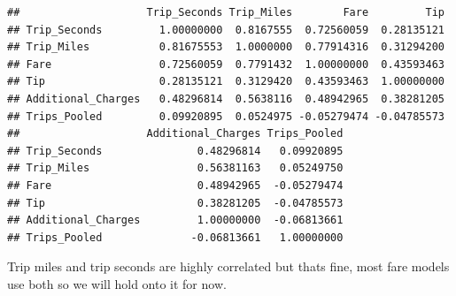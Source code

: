 \documentclass[
]{article}
\newenvironment{Shaded}{\begin{snugshade}}{\end{snugshade}}
\newcommand{\AttributeTok}[1]{\textcolor[rgb]{0.13,0.29,0.53}{#1}}
\newcommand{\ConstantTok}[1]{\textcolor[rgb]{0.56,0.35,0.01}{#1}}
\newcommand{\FunctionTok}[1]{\textcolor[rgb]{0.13,0.29,0.53}{\textbf{#1}}}
\newcommand{\NormalTok}[1]{#1}
\newcommand{\OtherTok}[1]{\textcolor[rgb]{0.56,0.35,0.01}{#1}}
\newcommand{\SpecialCharTok}[1]{\textcolor[rgb]{0.81,0.36,0.00}{\textbf{#1}}}
\begin{document}
\begin{verbatim}
##                    Trip_Seconds Trip_Miles        Fare         Tip
## Trip_Seconds         1.00000000  0.8167555  0.72560059  0.28135121
## Trip_Miles           0.81675553  1.0000000  0.77914316  0.31294200
## Fare                 0.72560059  0.7791432  1.00000000  0.43593463
## Tip                  0.28135121  0.3129420  0.43593463  1.00000000
## Additional_Charges   0.48296814  0.5638116  0.48942965  0.38281205
## Trips_Pooled         0.09920895  0.0524975 -0.05279474 -0.04785573
##                    Additional_Charges Trips_Pooled
## Trip_Seconds               0.48296814   0.09920895
## Trip_Miles                 0.56381163   0.05249750
## Fare                       0.48942965  -0.05279474
## Tip                        0.38281205  -0.04785573
## Additional_Charges         1.00000000  -0.06813661
## Trips_Pooled              -0.06813661   1.00000000
\end{verbatim}

Trip miles and trip seconds are highly correlated but thats fine, most
fare models use both so we will hold onto it for now.

\begin{Shaded}
\end{Shaded}
\end{document}

